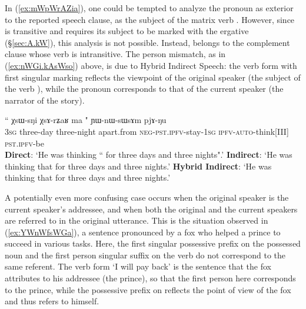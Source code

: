 In (\ref{ex:mWpWrAZia}), one could be tempted to analyze the pronoun  as exterior to the reported speech clause, as the subject of the matrix verb . However, since  is transitive and requires its subject to be marked with the ergative (§\ref{sec:A.kW}), this analysis is not possible. Instead,   belongs to the complement clause whose verb  is intransitive. The person mismatch, as in (\ref{ex:nWGi.kAsWso}) above, is due to Hybrid Indirect Speech: the verb form  with first singular marking reflects the viewpoint of the original speaker (the subject of the verb ), while the pronoun  corresponds to that of the current speaker (the narrator of the story). 
  
\begin{exe}
\ex \label{ex:mWpWrAZia}
\gll   `` χsɯ-sŋi χsɤ-rʑaʁ ma " ɲɯ-nɯ-sɯsɤm pjɤ-ŋu \\
 \textsc{3sg} three-day  three-night apart.from \textsc{neg}-\textsc{pst}.\textsc{ipfv}-stay-\textsc{1sg} \textsc{ipfv}-\textsc{auto}-think[III] \textsc{pst}.\textsc{ipfv}-be \\
\glt    \textbf{Direct}: `He was thinking `` for three days and three nights".'
\glt    \textbf{Indirect}: `He was thinking that  for three days and three nights.'
\glt  \textbf{Hybrid Indirect}: `He was thinking that   for three days and three nights.' 
\end{exe}

 

A potentially even more confusing case occurs when the original speaker is the current speaker's addressee, and when both the original and the current speakers are referred to in the original utterance. This is the situation observed in (\ref{ex:YWnWfsWGa}), a sentence pronounced by a fox who helped a prince to succeed in various tasks. Here,  the first singular possessive prefix  on the possessed noun  and the first person singular suffix  on the verb  do not correspond to the same referent. The verb form  `I will pay back' is the sentence that the fox attributes to his addressee (the prince), so that the first person here corresponds to the prince, while the possessive prefix on  reflects the point of view of the fox and thus refers to himself.

